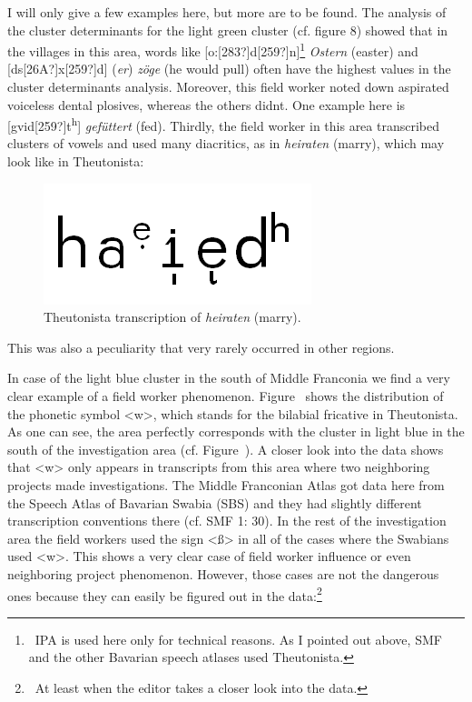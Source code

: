 \documentclass[output=paper]{LSP/langsci}
\begin{document}
I will only give a few examples here, but more are to be found. The analysis of the cluster determinants for the light green cluster (cf. figure 8) showed that in the villages in this area, words like [o:[283?]d[259?]n]\footnote{\ IPA is used here only for technical reasons. As I pointed out above, SMF and the other Bavarian speech atlases used Theutonista.} \textit{Ostern} ({\textquotesingle}easter{\textquotesingle}) and [ds[26A?]x[259?]d] (\textit{er}) \textit{zöge} ({\textquotesingle}he would pull{\textquotesingle}) often have the highest values in the cluster determinants{\textquotesingle} analysis. Moreover, this field worker noted down aspirated voiceless dental plosives, whereas the others didn{\textquotesingle}t. One example here is [gvid[259?]t\textsuperscript{h}] \textit{gefüttert} ({\textquotesingle}fed{\textquotesingle}). Thirdly, the field worker in this area transcribed clusters of vowels and used many diacritics, as in \textit{heiraten} ({\textquotesingle}marry{\textquotesingle}), which may look like  in Theutonista:

\begin{figure}
\includegraphics[width=.25\textwidth]{illustrations/mathus_fig9}
\caption{Theutonista transcription of \textit{heiraten} ({\textquotesingle}marry{\textquotesingle}).}
\label{fig:9}
\end{figure}

This was also a peculiarity that very rarely occurred in other regions.

In case of the light blue cluster in the south of Middle Franconia we find a very clear example of a field worker phenomenon. Figure~ shows the distribution of the phonetic symbol {\textless}w{\textgreater}, which stands for the bilabial fricative in Theutonista. As one can see, the area perfectly corresponds with the cluster in light blue in the south of the investigation area (cf. Figure~). A closer look into the data shows that {\textless}w{\textgreater} only appears in transcripts from this area where two neighboring projects made investigations. The Middle Franconian Atlas got data here from the Speech Atlas of Bavarian Swabia (SBS) and they had slightly different transcription conventions there (cf. SMF 1: 30). In the rest of the investigation area the field workers used the sign {\textless}ß{\textgreater} in all of the cases where the Swabians used {\textless}w{\textgreater}. This shows a very clear case of field worker influence or even neighboring project phenomenon. However, those cases are not the dangerous ones because they can easily be figured out in the data:\footnote{\ At least when the editor takes a closer look into the data.}
\end{document}
